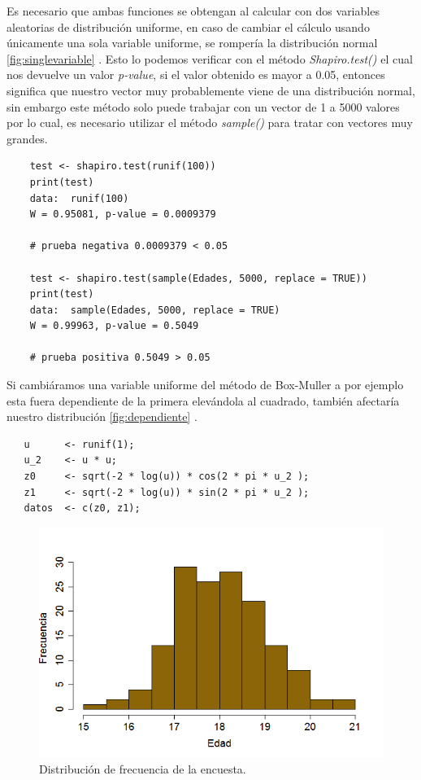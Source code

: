 \documentclass[]{article}
\begin{document}
Es necesario que ambas funciones se obtengan al calcular con dos variables aleatorias de distribución uniforme, en caso de cambiar el cálculo usando únicamente una sola variable uniforme, se rompería la distribución normal  \autoref{fig:singlevariable} .
Esto lo podemos verificar con el método \textit{Shapiro.test()}
el cual nos devuelve un valor \textit{p-value}, si el valor obtenido es mayor a 0.05, entonces significa que nuestro vector muy probablemente viene de una distribución normal, sin embargo este método solo puede trabajar con un vector de 1 a 5000 valores por lo cual, es necesario utilizar el método  \textit{sample()} para tratar con vectores muy grandes.
  \begin{lstlisting}
    test <- shapiro.test(runif(100)) 
    print(test)
    data:  runif(100)
	W = 0.95081, p-value = 0.0009379
	
	# prueba negativa 0.0009379 < 0.05
	                 
    test <- shapiro.test(sample(Edades, 5000, replace = TRUE))
    print(test)
	data:  sample(Edades, 5000, replace = TRUE)
	W = 0.99963, p-value = 0.5049
	
	# prueba positiva 0.5049 > 0.05
   \end{lstlisting}

Si cambiáramos una variable uniforme del método de Box-Muller a por ejemplo esta fuera dependiente de la primera elevándola al cuadrado, también afectaría nuestro distribución \autoref{fig:dependiente} .

  \begin{lstlisting}
   u      <- runif(1);
   u_2    <- u * u;
   z0     <- sqrt(-2 * log(u)) * cos(2 * pi * u_2 );
   z1     <- sqrt(-2 * log(u)) * sin(2 * pi * u_2 );
   datos  <- c(z0, z1);
   \end{lstlisting}

\begin{figure}[b]
    \centering
    \includegraphics[width=.5\linewidth]{Frecuencia.png}    \caption{Distribución de frecuencia de la encuesta.}
    \label{fig:Negativo}
\end{figure}
\end{document}
